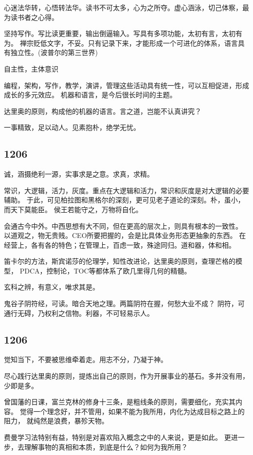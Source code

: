 心迷法华转，心悟转法华。读书不可太多，心为之所夺。虚心涵泳，切己体察，最为读书者之心得。

坚持写作。写比读更重要，输出倒逼输入。写具有多项功能，太初有言，太初有为。
禅宗贬低文字，不妥。只有记录下来，才能形成一个可进化的体系，语言具有独立性。(波普尔的第三世界)

自主性，主体意识

编程，架构，写作，教学，演讲，管理这些活动具有统一性，可以互相促进，形成成长的多元效应。
机器和语言，是今后很长时间的主题。

达里奥的原则，构成他的机器的语言。言之道，岂能不认真讲究？

一事精致，足以动人。见素抱朴，绝学无忧。

\subsection{1206}

诚，涵摄绝利一源，实事求是之意。求真，求精。

常识，大逻辑，活力，灰度。重点在大逻辑和活力，常识和灰度是对大逻辑的必要辅助。
于此，可见柏拉图和黑格尔的深刻，更可见老子道论的深刻。朴，虽小，而天下莫能臣。
侯王若能守之，万物将自化。

会通古今中外。中西思想有大不同，但在更高的层次上，则具有根本的一致性。
以道观之，物无贵贱。CEO所要把握的，会是比具体业务形态更抽象的东西。
在经营上，各有各的特色；在管理上，百虑一致，殊途同归。道和器，体和相。

笛卡尔的方法，斯宾诺莎的伦理学，知性改进论，达里奥的原则，查理芒格的模型，
PDCA，控制论，TOC等都体系了欧几里得几何的精髓。

玄科之辨，有意义，唯求其是。

鬼谷子阴符经，可读。暗合天地之理。两篇阴符在握，何愁大业不成？
阴符，可通行无碍，乃权利之信物。利器，不可轻易示人。

\subsection{1206}

觉知当下，不要被思维牵着走。用志不分，乃凝于神。

尽心践行达里奥的原则，提炼出自己的原则，作为开展事业的基石。多并没有用，少即是多。

曾国藩的日课，富兰克林的修身十三条，是粗线条的原则，需要细化，充实其内容。
觉得一个理念好，并不管用，如果不能为我所用，内化为达成目标之路上的阻力，
就纯然是浪费，暴殄天物。

费曼学习法特别有益，特别是对喜欢陷入概念之中的人来说，更是如此。
更进一步，去理解事物的真相和本质，到底是什么？如何为我所用？

